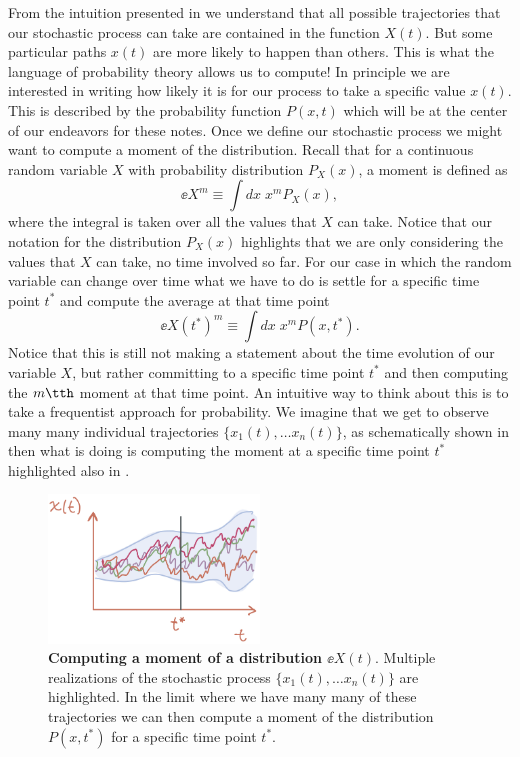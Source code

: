 From the intuition presented in  we understand that all
possible trajectories that our stochastic process can take are contained in the
function $X(t)$. But some particular paths $x(t)$ are more likely to happen
than others. This is what the language of probability theory allows us to
compute! In principle we are interested in writing how likely it is for our
process to take a specific value $x(t)$. This is described by the probability
function $P(x, t)$ which will be at the center of our endeavors for these
notes. Once we define our stochastic process we might want to compute a moment
of the distribution. Recall that for a continuous random variable $X$ with
probability distribution $P_X(x)$, a moment is defined as
\begin{equation}
  \ee{X^m} \equiv \int dx \; x^m P_X(x),
\end{equation}
where the integral is taken over all the values that $X$ can take. Notice that
our notation for the distribution $P_X(x)$ highlights that we are only
considering the values that $X$ can take, no time involved so far. For our case
in which the random variable can change over time what we have to do is settle
for a specific time point $t^*$ and compute the average at that time point
\begin{equation}
  \ee{X(t^*)^m} \equiv \int dx \; x^m P(x, t^*).
  \label{eq_process_moment}
\end{equation}
Notice that this is still not making a statement about the time evolution of
our variable $X$, but rather committing to a specific time point $t^*$ and then
computing the $m\tth$ moment at that time point. An intuitive way to think
about this is to take a frequentist approach for probability. We imagine that
we get to observe many many individual trajectories $\{x_1(t), \ldots
x_n(t)\}$, as schematically shown in  then what
 is doing is computing the moment at a specific time
point $t^*$ highlighted also in .

\begin{figure}[h!]
	\centering \includegraphics[width=0.5\textwidth]
  {./fig/chapter_prob/01_00002.jpeg}
	\caption{\textbf{Computing a moment of a distribution $\ee{X(t)}$}. Multiple
  realizations of the stochastic process $\{x_1(t), \ldots x_n(t)\}$ are
  highlighted. In the limit where we have many many of these trajectories we
  can then compute a moment of the distribution $P(x, t^*)$ for a specific time
  point $t^*$. }
  \label{fig01_00002}
\end{figure}

